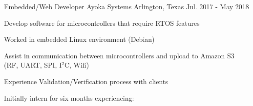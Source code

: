 \begin{cventries}
\cventry
{Embedded/Web Developer} %
{Ayoka Systems} %
{Arlington, Texas} %
{Jul. 2017 - May 2018} %
{ %
\begin{cvitems}
\item {Develop software for microcontrollers that require RTOS features}
\item {Worked in embedded Linux environment (Debian)}
\item {Assist in communication between microcontrollers and upload to Amazon S3 (RF, UART, SPI, I$^2$C, Wifi)}
\item {Experience Validation/Verification process with clients}
\item {Initially intern for six months experiencing: }
\end{cvitems}
}

\end{cventries}
